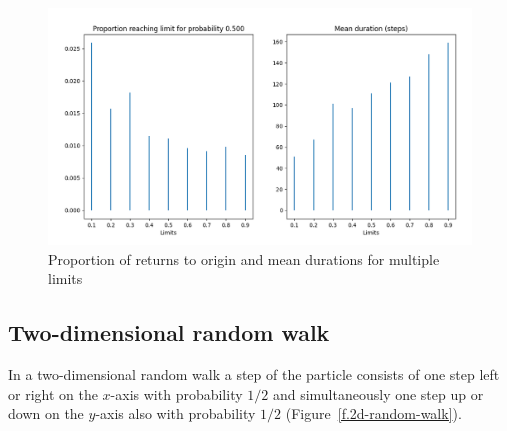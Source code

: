 \begin{figure}
\begin{center}
\includegraphics[width=\textwidth]{random-walk-02}
\caption{Proportion of returns to origin and mean durations for multiple limits}\label{f.random-walk-02}
\end{center}
\end{figure}

\subsection{Two-dimensional random walk}

In a two-dimensional random walk a step of the particle consists of one step left or right on the $x$-axis with probability $1/2$ and simultaneously one step up or down on the $y$-axis also with probability $1/2$ (Figure~\ref{f.2d-random-walk}).

